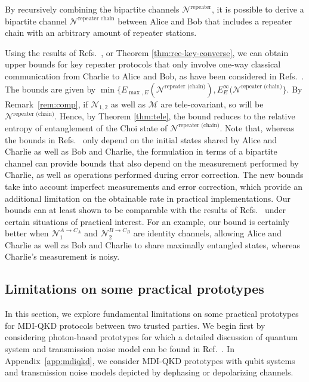 \documentclass[aps,pra,twocolumn,superscriptaddress,longbibliography]{revtex4-1}
\newcommand{\mc}[1]{\mathcal{#1}}
\begin{document}
By recursively combining the bipartite channels ${\mc N}^{\text{repeater}}$, it is possible to derive a bipartite channel ${\mc N}^{\text{repeater chain}}$ between Alice and Bob that includes a repeater chain with an arbitrary amount of repeater stations. 


Using the results of Refs.~\cite{DBW17,BDW18,D18thesis}, or Theorem \ref{thm:ree-key-converse}, we can obtain upper bounds for key repeater protocols that only involve one-way classical communication from Charlie to Alice and Bob, as have been considered in Refs.~\cite{bauml2015limitations,christandl2017private}. The bounds are given by $\min\{ E_{\max,E}(\mc{N}^{\text{repeater (chain)}}),E^{\infty}_{E}(\mc{N}^{\text{repeater (chain)}}\}$. By Remark~\ref{rem:comp}, if $\mc{N}_{1,2}$ as well as $\mc{M}$ are tele-covariant, so will be $\mc{N}^{\text{repeater (chain)}}$. Hence, by Theorem \ref{thm:tele}, the bound reduces to the relative entropy of entanglement of the Choi state of $\mc{N}^{\text{repeater (chain)}}$. Note that, whereas the bounds in Refs.~\cite{bauml2015limitations,christandl2017private} only depend on the initial states shared by Alice and Charlie as well as  Bob and Charlie, the formulation in terms of a bipartite channel can provide bounds that also depend on the measurement performed by Charlie, as well as operations performed during error correction. The new bounds take into account imperfect measurements and error correction, which provide an additional limitation on the obtainable rate in practical implementations. Our bounds can at least shown to be comparable with the results of Refs.~\cite{bauml2015limitations,christandl2017private} under certain situations of practical interest. For an example, our bound is certainly better when ${\mc N}_1^{A\to C_A}$ and ${\mc N}_2^{B\to C_B}$ are identity channels, allowing Alice and Charlie as well as  Bob and Charlie to share maximally entangled states, whereas Charlie's measurement is noisy. 



\subsection{Limitations on some practical prototypes}\label{sec:ex-mdi}
In this section, we explore fundamental limitations on some practical prototypes for MDI-QKD protocols between two trusted parties. We begin first by considering photon-based prototypes for which a detailed discussion of quantum system and transmission noise model can be found in Ref.~\cite{DKD18}. In Appendix~\ref{app:mdiqkd}, we consider MDI-QKD prototypes with qubit systems and transmission noise models depicted by dephasing or depolarizing channels.
\end{document}
